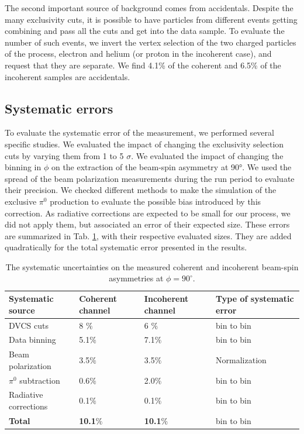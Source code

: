 \documentclass[aps,prc,preprint,superscriptaddress]{revtex4}
\begin{document}
The second important source of background comes from accidentals. Despite the many exclusivity cuts, it is 
possible to have particles from different events getting combining and pass all the cuts and get 
into the data sample. To evaluate the number of such events, we invert the vertex selection 
of the two charged 
particles of the process, electron and helium (or proton in the incoherent case), and request that they
are separate. We find 4.1\% of the coherent and 6.5\% of the incoherent samples are accidentals. 

\subsection{Systematic errors}

To evaluate the systematic error of the measurement, we performed several specific studies. We 
evaluated the impact of changing the exclusivity selection cuts by varying them from 1 to 5 $\sigma$. 
We evaluated the impact of changing the binning in $\phi$ on the extraction of the beam-spin asymmetry
at 90°. We used the spread of the beam polarization measurements during the run period to evaluate their 
precision. We checked different methods to make the simulation of the exclusive $\pi^0$
production to evaluate the 
possible bias introduced by this correction. As radiative corrections are expected to be small
for our process, we did not apply them, but associated an error of their expected size.
These errors are summarized in Tab. \ref{Table:systematic_uncertainties}, with their respective 
evaluated sizes. They are added quadratically for the total systematic error presented in the results.

\begin{table}[tbp]
\begin{center}
	\begin{tabular}{|m{4cm}|m{2cm}<{\centering}|m{2.3cm}<{\centering}|m{3.7cm}<{\centering}|}
\hline
\bf Systematic source & \bf  Coherent channel  & \bf Incoherent channel & \bf Type of systematic 
error\\
\hline
DVCS cuts & 8 $\%$ &  6 $\%$ & bin to bin\\
\hline
Data binning & 5.1$\%$ & 7.1$\%$ &bin to bin\\
\hline
Beam polarization &  3.5$\%$ &  3.5$\%$& Normalization\\
\hline
$\pi^0$ subtraction &  0.6$\%$ &  2.0$\%$ &bin to bin\\
\hline
Radiative corrections &  0.1$\%$ & 0.1$\%$ & bin to bin\\
\hline
\textbf{Total} &  \textbf{10.1}$\%$ &   \textbf{10.1}$\%$ &bin to 
bin\\
\hline
\end{tabular}
\caption{The systematic uncertainties on the measured coherent and incoherent 
beam-spin asymmetries at $\phi = 90^{\circ}$.}
\label{Table:systematic_uncertainties}
\end{center}
\end{table}
\end{document}
